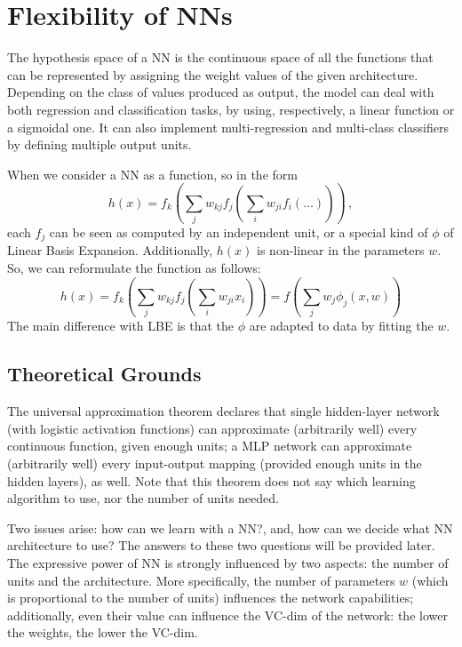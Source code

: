 \section{Flexibility of NNs}

The hypothesis space of a NN is the continuous space of all the functions that can be represented by assigning the weight values of the given architecture. Depending on the class of values produced as output, the model can deal with both regression and classification tasks, by using, respectively, a linear function or a sigmoidal one. It can also implement multi-regression and multi-class classifiers by defining multiple output units.

When we consider a NN as a function, so in the form
\begin{equation*}
    h(x) = f_k(\sum_j w_{kj} f_j (\sum_i w_{ji} f_i(\dots))) \, ,
\end{equation*}
each $f_j$ can be seen as computed by an independent unit, or a special kind of $\phi$ of Linear Basis Expansion. Additionally, $h(x)$ is non-linear in the parameters $w$. So, we can reformulate the function as follows:
\begin{equation*}
    h(x) = f_k(\sum_j w_{kj} f_j (\sum_i w_{ji} x_i)) = f(\sum_j w_j \phi_j(x,w))
\end{equation*}
The main difference with LBE is that the $\phi$ are adapted to data by fitting the $w$.

\subsection{Theoretical Grounds}

The universal approximation theorem declares that single hidden-layer network (with logistic activation functions) can approximate (arbitrarily well) every continuous function, given enough units; a MLP network can approximate (arbitrarily well) every input-output mapping (provided enough units in the hidden layers), as well. Note that this theorem does not say which learning algorithm to use, nor the number of units needed.

Two issues arise: how can we learn with a NN?, and, how can we decide what NN architecture to use? The answers to these two questions will be provided later. The expressive power of NN is strongly influenced by two aspects: the number of units and the architecture. More specifically, the number of parameters $w$ (which is proportional to the number of units) influences the network capabilities; additionally, even their value can influence the VC-dim of the network: the lower the weights, the lower the VC-dim.

